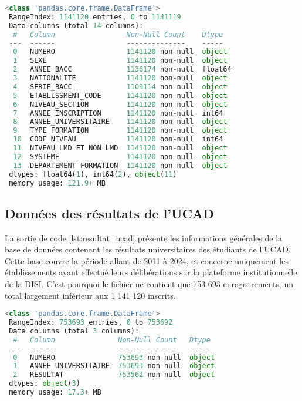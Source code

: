 \begin{lstlisting}[language=Python,
    caption=Info global du data des inscriptions, 
    label=lst:inscription_ucad, 
    basicstyle=\ttfamily\footnotesize, 
    backgroundcolor=\color{gray!10}
]
 <class 'pandas.core.frame.DataFrame'>
 RangeIndex: 1141120 entries, 0 to 1141119
 Data columns (total 14 columns):
  #   Column                 Non-Null Count    Dtype  
 ---  ------                 --------------    -----  
  0   NUMERO                 1141120 non-null  object 
  1   SEXE                   1141120 non-null  object 
  2   ANNEE_BACC             1136174 non-null  float64
  3   NATIONALITE            1141120 non-null  object 
  4   SERIE_BACC             1109114 non-null  object 
  5   ETABLISSMENT_CODE      1141120 non-null  object 
  6   NIVEAU_SECTION         1141120 non-null  object 
  7   ANNEE_INSCRIPTION      1141120 non-null  int64  
  8   ANNEE_UNIVERSITAIRE    1141120 non-null  object 
  9   TYPE_FORMATION         1141120 non-null  object 
  10  CODE_NIVEAU            1141120 non-null  int64  
  11  NIVEAU LMD ET NON LMD  1141120 non-null  object 
  12  SYSTEME                1141120 non-null  object 
  13  DEPARTEMENT FORMATION  1141120 non-null  object 
 dtypes: float64(1), int64(2), object(11)
 memory usage: 121.9+ MB
\end{lstlisting}

\subsection{Données des résultats de l’UCAD}

La sortie de code \ref{lst:resultat_ucad} présente les informations générales de la base de données contenant les résultats universitaires des étudiants de l’UCAD. 
Cette base couvre la période allant de 2011 à 2024, et concerne uniquement les établissements ayant effectué leurs délibérations sur la plateforme institutionnelle de la DISI. 
C’est pourquoi le fichier ne contient que 753 693 enregistrements, un total largement inférieur aux 1 141 120 inscrits.

\begin{lstlisting}[language=Python,
    caption=Info global du data des résultats, 
    label=lst:resultat_ucad, 
    basicstyle=\ttfamily\footnotesize, 
    backgroundcolor=\color{gray!10}
]
 <class 'pandas.core.frame.DataFrame'>
 RangeIndex: 753693 entries, 0 to 753692
 Data columns (total 3 columns):
  #   Column               Non-Null Count   Dtype 
 ---  ------               --------------   ----- 
  0   NUMERO               753693 non-null  object
  1   ANNEE UNIVERSITAIRE  753693 non-null  object
  2   RESULTAT             753562 non-null  object
 dtypes: object(3)
 memory usage: 17.3+ MB
\end{lstlisting}

